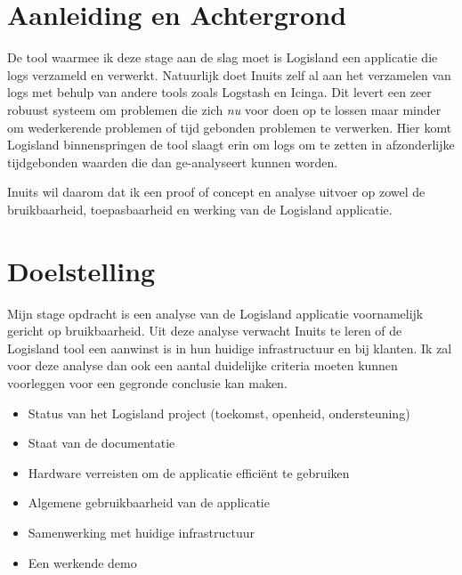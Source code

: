 \documentclass[a4paper]{article}
\begin{document}
\newpage{}
\section{Aanleiding en Achtergrond}
De tool waarmee ik deze stage aan de slag moet is Logisland een applicatie die logs verzameld en verwerkt.
Natuurlijk doet Inuits zelf al aan het verzamelen van logs met behulp van andere tools zoals Logstash en Icinga.
Dit levert een zeer robuust systeem om problemen die zich \emph{nu} voor doen op te lossen maar minder om wederkerende problemen of tijd gebonden problemen te verwerken.
Hier komt Logisland binnenspringen de tool slaagt erin om logs om te zetten in afzonderlijke tijdgebonden waarden die dan ge-analyseert kunnen worden.
\par
Inuits wil daarom dat ik een proof of concept en analyse uitvoer op zowel de bruikbaarheid, toepasbaarheid en werking van de Logisland applicatie. 

\newpage{}
\section{Doelstelling}
Mijn stage opdracht is een analyse van de Logisland applicatie voornamelijk gericht op bruikbaarheid. 
Uit deze analyse verwacht Inuits te leren of de Logisland tool een aanwinst is in hun huidige infrastructuur en bij klanten.
Ik zal voor deze analyse dan ook een aantal duidelijke criteria moeten kunnen voorleggen voor een gegronde conclusie kan maken.
\par
\begin{itemize}
\item Status van het Logisland project (toekomst, openheid, ondersteuning)
\item Staat van de documentatie 
\item Hardware verreisten om de applicatie efficiënt te gebruiken
\item Algemene gebruikbaarheid van de applicatie
\item Samenwerking met huidige infrastructuur
\item Een werkende demo

\end{itemize}

\newpage{}
\end{document}
